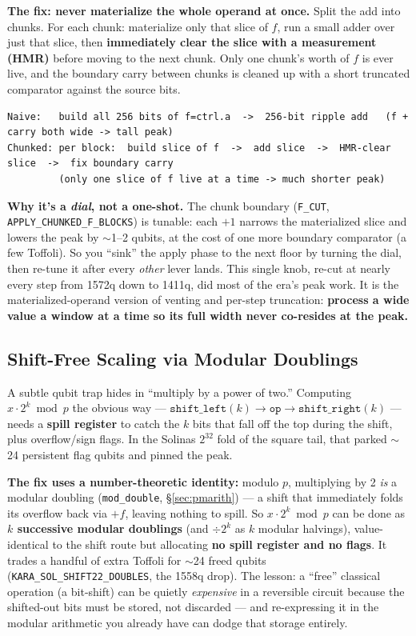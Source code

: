 \documentclass[11pt,a4paper]{article}
\begin{document}
\textbf{The fix: never materialize the whole operand at once.} Split the add into chunks. For each
chunk: materialize only that slice of $f$, run a small adder over just that slice, then
\textbf{immediately clear the slice with a measurement (HMR)} before moving to the next chunk. Only
one chunk's worth of $f$ is ever live, and the boundary carry between chunks is cleaned up with a
short truncated comparator against the source bits.

\begin{lstlisting}
Naive:   build all 256 bits of f=ctrl.a  ->  256-bit ripple add   (f + carry both wide -> tall peak)
Chunked: per block:  build slice of f  ->  add slice  ->  HMR-clear slice  ->  fix boundary carry
         (only one slice of f live at a time -> much shorter peak)
\end{lstlisting}

\textbf{Why it's a \emph{dial}, not a one-shot.} The chunk boundary (\texttt{F\_CUT},
\texttt{APPLY\_CHUNKED\_F\_BLOCKS}) is tunable: each $+1$ narrows the materialized slice and lowers
the peak by $\sim$1--2 qubits, at the cost of one more boundary comparator (a few Toffoli). So you
``sink'' the apply phase to the next floor by turning the dial, then re-tune it after every
\emph{other} lever lands. This single knob, re-cut at nearly every step from 1572q down to 1411q, did
most of the era's peak work. It is the materialized-operand version of venting and per-step
truncation: \textbf{process a wide value a window at a time so its full width never co-resides at the
peak.}

\subsection{Shift-Free Scaling via Modular Doublings}
\label{sec:shiftfree}

A subtle qubit trap hides in ``multiply by a power of two.'' Computing $x \cdot 2^k \bmod p$ the
obvious way --- $\texttt{shift\_left}(k) \to \texttt{op} \to \texttt{shift\_right}(k)$ --- needs a
\textbf{spill register} to catch the $k$ bits that fall off the top during the shift, plus
overflow/sign flags. In the Solinas $2^{32}$ fold of the square tail, that parked $\sim$24 persistent
flag qubits and pinned the peak.

\textbf{The fix uses a number-theoretic identity:} modulo $p$, multiplying by 2 \emph{is} a modular
doubling (\texttt{mod\_double}, \S\ref{sec:pmarith}) --- a shift that immediately folds its overflow
back via $+f$, leaving nothing to spill. So $x \cdot 2^k \bmod p$ can be done as \textbf{$k$ successive
modular doublings} (and $\div 2^k$ as $k$ modular halvings), value-identical to the shift route but
allocating \textbf{no spill register and no flags}. It trades a handful of extra Toffoli for $\sim$24
freed qubits (\texttt{KARA\_SOL\_SHIFT22\_DOUBLES}, the 1558q drop). The lesson: a ``free'' classical
operation (a bit-shift) can be quietly \emph{expensive} in a reversible circuit because the
shifted-out bits must be stored, not discarded --- and re-expressing it in the modular arithmetic you
already have can dodge that storage entirely.
\end{document}

